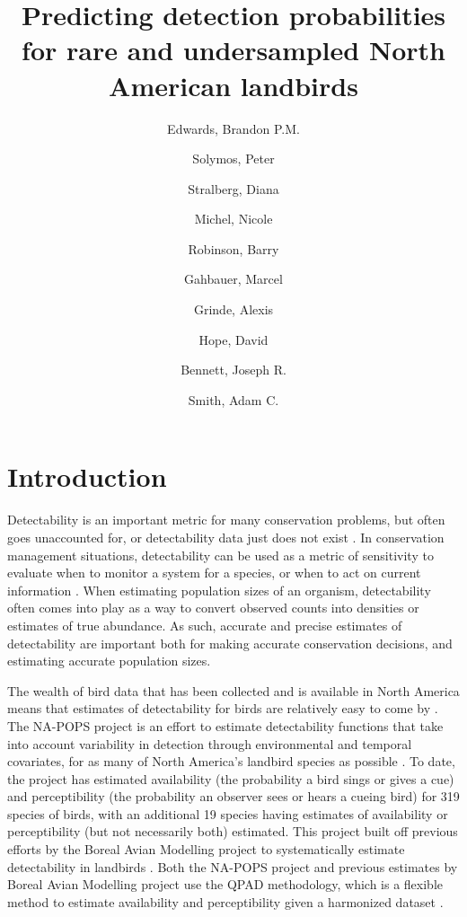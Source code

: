 \documentclass[12pt]{article}
\title{Predicting detection probabilities for rare and undersampled North American landbirds}
\author{
	Edwards, Brandon P.M.\\
	\and
	Solymos, Peter\\
	\and
	Stralberg, Diana\\
	\and
	Michel, Nicole\\
	\and
	Robinson, Barry\\
	\and
	Gahbauer, Marcel\\
	\and
	Grinde, Alexis\\
	\and
	Hope, David\\
	\and
	Bennett, Joseph R.\\
	\and
	Smith, Adam C.\\
}
\begin{document}
\maketitle

\begin{abstract}

\end{abstract}

\section{Introduction}

\par Detectability is an important metric for many conservation problems, but often goes unaccounted for, or detectability data just does not exist \citep{bennett_how_2023}.
In conservation management situations, detectability can be used as a metric of sensitivity to evaluate when to monitor a system for a species, or when to act on current information \citep{canessa_when_2015, bennett_when_2018}.
When estimating population sizes of an organism, detectability often comes into play as a way to convert observed counts into densities or estimates of true abundance.
As such, accurate and precise estimates of detectability are important both for making accurate conservation decisions, and estimating accurate population sizes.

\par The wealth of bird data that has been collected and is available in North America means that estimates of detectability for birds are relatively easy to come by \citep{bennett_how_2023}.
The NA-POPS project is an effort to estimate detectability functions that take into account variability in detection through environmental and temporal covariates, for as many of North America's landbird species as possible \citep{edwards_point_2023}. 
To date, the project has estimated availability (the probability a bird sings or gives a cue) and perceptibility (the probability an observer sees or hears a cueing bird) for 319 species of birds, with an additional 19 species having estimates of availability or perceptibility (but not necessarily both) estimated.
This project built off previous efforts by the Boreal Avian Modelling project \citep{cumming_toward_2010} to systematically estimate detectability in landbirds \citep{solymos_calibrating_2013, solymos_evaluating_2018}.
Both the NA-POPS project and previous estimates by Boreal Avian Modelling project use the QPAD methodology, which is a flexible method to estimate availability and perceptibility given a harmonized dataset \citep{barker_ecological_2015, solymos_calibrating_2013}.
\end{document}
